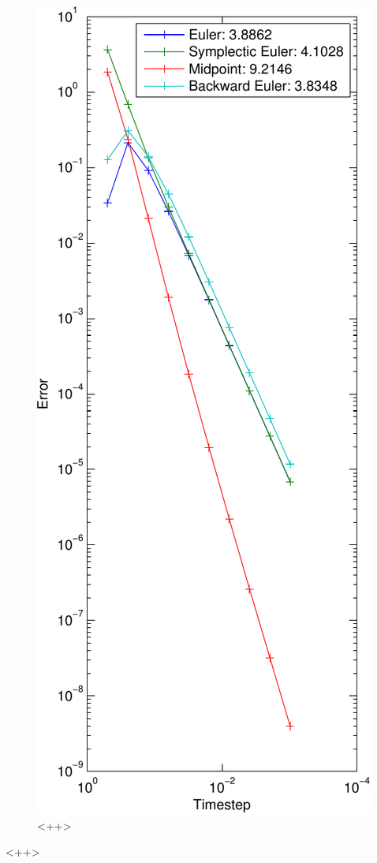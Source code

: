 \begin{figure}[]
	\begin{center}
		\includegraphics*[width=\textwidth]{graphics/ErrorCvgDamp0_01-crop.pdf}
	\end{center}
	\caption{<++>}
	\label{fig:<++>}
\end{figure}<++>
